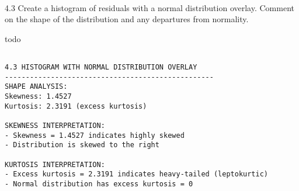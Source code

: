 \documentclass[11pt, twocolumn]{article}
\begin{document}
    \begin{center}
    \end{center}
    { \hspace*{\fill} \\}
    
    4.3 Create a histogram of residuals with a normal distribution overlay.
Comment on the shape of the distribution and any departures from
normality.

todo

    \begin{Verbatim}[commandchars=\\\{\}]

4.3 HISTOGRAM WITH NORMAL DISTRIBUTION OVERLAY
--------------------------------------------------
SHAPE ANALYSIS:
Skewness: 1.4527
Kurtosis: 2.3191 (excess kurtosis)

SKEWNESS INTERPRETATION:
- Skewness = 1.4527 indicates highly skewed
- Distribution is skewed to the right

KURTOSIS INTERPRETATION:
- Excess kurtosis = 2.3191 indicates heavy-tailed (leptokurtic)
- Normal distribution has excess kurtosis = 0
    \end{Verbatim}

    \begin{center}
    \end{center}
    { \hspace*{\fill} \\}
    
\end{document}
